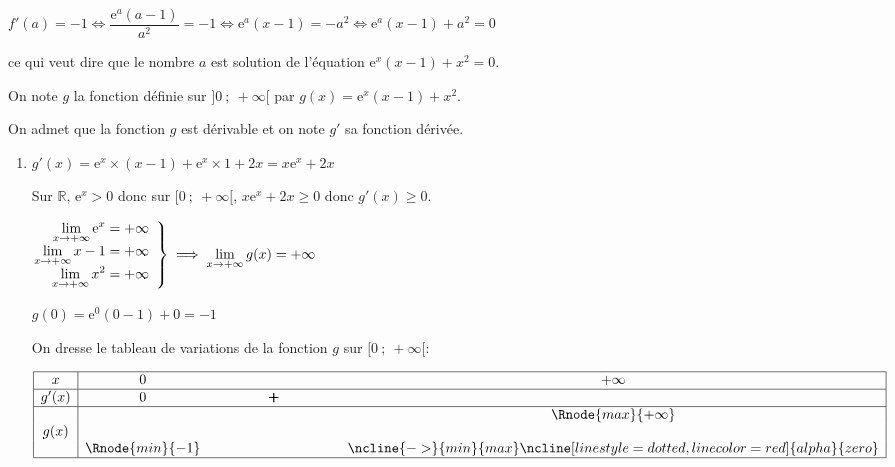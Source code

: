 \documentclass[10pt]{article}
\providecommand{\R}{\mathbb{R}}
\providecommand{\e}{{\mathrm{e}}}
\providecommand{\ds}{\displaystyle}
\begin{document}
\begin{enumerate}
\begin{enumerate}
$f'(a)=-1 \iff \dfrac{\e^{a} (a-1)}{a^2}=-1 \iff \e^{a} (x-1) = -a^2 \iff \e^{a}(x-1)+a^2=0$

ce qui veut dire que le nombre $a$ est solution de l'équation $\e^x(x - 1) + x^2  = 0$.
			\end{enumerate}
		
On note $g$ la fonction définie sur $]0~;~ +\infty[$ par $g(x) = \e^x(x - 1) + x^2 $.

On admet que la fonction $g$ est dérivable et on note $g'$ sa fonction dérivée.

\begin{enumerate}[resume]
		\item 
$g'(x)= \e^{x}\times (x-1) + \e^{x}\times 1 + 2x = x\e^{x}+2x$

Sur $\R$, $\e^{x}>0$ donc sur $[0~;~+\infty[$, $x\e^{x}+2x \geqslant 0$ donc $g'(x)\geqslant 0$.

$\left.
\begin{array}{@{} r}
\ds\lim_{x\to +\infty} \e^{x} = +\infty\\
\ds\lim_{x\to +\infty} x-1= +\infty\\
\ds\lim_{x\to +\infty} x^2 = +\infty
\end{array}
\right \rbrace
\implies
\ds\lim_{x\to +\infty} g(x) = +\infty$

$g(0)=\e^{0}(0-1)+0=-1$

On dresse le tableau de variations de la fonction $g$ sur $[0~;~+\infty[$:

\begin{center}
{\renewcommand{\arraystretch}{1.3}
     
     
\def\esp{\hspace*{3cm}}
     
\def\hauteur{0pt}
     
$\begin{array}{|c| *3{c}|}
\hline
 x & 0   & \esp & +\infty \\
 \hline
g'(x) & 0   & \pmb{+} & \\  
\hline
  &   &    & \Rnode{max}{+\infty}   \\
g(x) & &  &  \rule{0pt}{\hauteur} \\
 &     \Rnode{min}{-1} & & \rule{0pt}{\hauteur}
\ncline{->}{min}{max}
\ncline[linestyle=dotted, linecolor=red]{alpha}{zero}\\
\hline
\end{array}$
}
\end{center}


\end{enumerate}
\end{enumerate}
\end{document}
